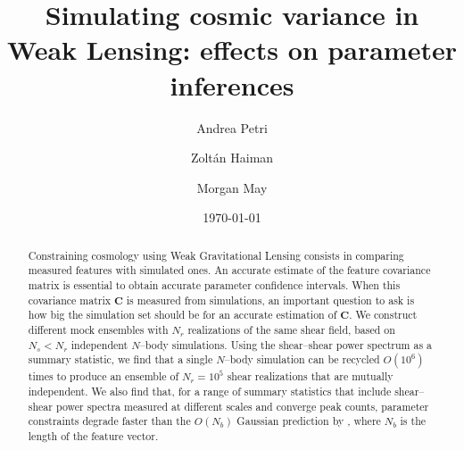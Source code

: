 \documentclass[reprint,aps,prd,superscriptaddress,showkeys,showpacs]{revtex4-1}
\newcommand{\bb}[1]{\mathbf{#1}}
\begin{document}
\title{Simulating cosmic variance in Weak Lensing: effects on parameter inferences}

\author{Andrea Petri}

\author{Zolt\'an Haiman}

\author{Morgan May}

\date{\today}

\label{firstpage}

\begin{abstract}
Constraining cosmology using Weak Gravitational Lensing consists in comparing measured features with simulated ones. An accurate estimate of the feature covariance matrix is essential to obtain accurate parameter confidence intervals. When this covariance matrix $\bb{C}$ is measured from simulations, an important question to ask is how big the simulation set should be for an accurate estimation of $\bb{C}$. We construct different mock ensembles with $N_r$ realizations of the same shear field, based on $N_s<N_r$ independent $N$--body simulations. Using the shear--shear power spectrum as a summary statistic, we find that a single $N$--body simulation can be recycled $O(10^6)$ times to produce an ensemble of $N_r=10^5$ shear realizations that are mutually independent. We also find that, for a range of summary statistics that include shear--shear power spectra measured at different scales and converge peak counts, parameter constraints degrade faster than the $O(N_b)$ Gaussian prediction by \citep{DodelsonSchneider13}, where $N_b$ is the length of the feature vector.       
\end{abstract}



\maketitle


\end{document}
